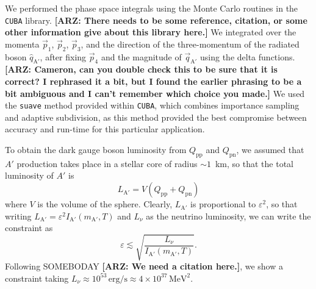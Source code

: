 \documentclass[nofootinbib,prd,superscriptaddress,twocolumn]{revtex4}
\newcommand{\arz}[1]{{{\bf{\color{BrickRed}[ARZ: #1]}}}}
\begin{document}
We performed the phase space integrals using the Monte Carlo routines in the {\tt CUBA} library. 
\arz{There needs to be some reference, citation, or some other information give about this library here.} 
We integrated over the momenta $\vec{p}_1$, $\vec{p}_2$, $\vec{p}_3$, and the direction of the 
three-momentum of the radiated boson $\hat{q}_{\mathrm{A}'}$, after fixing $\vec{p}_4$ 
and the magnitude of $\vec{q}_{\mathrm{A}'}$ using the delta functions. 
\arz{Cameron, can you double check this to be sure that it is correct? I rephrased it a bit, 
but I found the earlier phrasing to be a bit ambiguous and I can't remember which choice 
you made.} We used the {\tt suave} method provided within {\tt CUBA}, which combines 
importance sampling and adaptive subdivision, as this method provided the best compromise 
between accuracy and run-time for this particular application.

To obtain the dark gauge boson luminosity from $Q_{\mathrm{pp}}$ and $Q_{\mathrm{pn}}$, 
we assumed that $A'$ production takes place in a stellar core of radius $\sim 1$~km, so that 
the total luminosity of $A'$ is 
%
\begin{equation}
L_{\mathrm{A}'} = V (Q_{\mathrm{pp}} + Q_{\mathrm{pn}})
\end{equation}
%
where $V$ is the volume of the sphere. Clearly, $L_{\mathrm{A}'}$ is proportional to $\varepsilon^2$, 
so that writing $L_{\mathrm{A}'} = \varepsilon^2 I_{\mathrm{A}'}(m_{\mathrm{A}'},T)$ and 
$L_{\nu}$ as the neutrino luminosity, we can write the constraint as 
%
\begin{equation}
\varepsilon \lesssim \sqrt{\frac{L_{\nu}}{I_{\mathrm{A}'}(m_{\mathrm{A}'}, T)}}.
\end{equation}
%
Following SOMEBODAY \arz{We need a citation here.}, we show a constraint taking 
$L_{\nu} \approx 10^{53}\, \mathrm{erg/s} \approx 4 \times 10^{37}\, \mathrm{MeV}^2$. 

\end{document}
